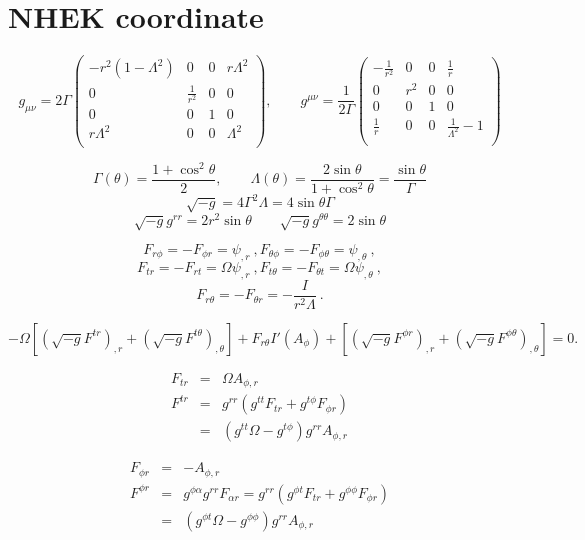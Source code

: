 \documentclass[aps,prd,preprint,groupedaddress]{revtex4-1}
\def\nn{\nonumber}
\def\beq{\begin{equation}}
\def\beqn{\begin{eqnarray}}
\def\eeq{\end{equation}}
\def\eeqn{\end{eqnarray}}
\def\st{\sin\theta}
\def\cct{\cos^2\theta}
\def\Ar{A_{\phi,r}}
\begin{document}
\newpage
\section{NHEK coordinate}

\[g_{\mu\nu}=2\Gamma\left(
  \begin{array}{cccc}
    -r^2(1-\Lambda^2) & 0 & 0 & r\Lambda^2 \\
    0& \frac{1}{r^2} & 0 & 0\\
    0 & 0 & 1 & 0 \\
   r\Lambda^2  & 0 & 0 & \Lambda^2 \\
  \end{array}\right), \qquad g^{\mu\nu}=\frac{1}{2\Gamma}\left(
  \begin{array}{cccc}
    -\frac{1}{r^2} & 0 & 0 & \frac{1}{r} \\
    0& r^2 & 0 & 0\\
    0 & 0 & 1 & 0 \\
   \frac{1}{r}  & 0 & 0 & \frac{1}{\Lambda^2}-1 \\
  \end{array}
\right)\]

\[\Gamma(\theta) = \frac{1+\cct}{2},\qquad \Lambda(\theta) = \frac{2\st}{1+\cct} = \frac{\st}{\Gamma} \]
\[\sqrt{-g} = 4\Gamma^2\Lambda = 4\st\Gamma \]
\[\sqrt{-g}g^{rr} = 2r^2\sin\theta\qquad \sqrt{-g}g^{\theta\theta} = 2\st \]

\beq
\label{poloidal}
F_{r\phi} = -F_{\phi r}=\psi_{,r} \ , F_{\theta\phi} = -
F_{\phi\theta} = \psi_{,\theta} \ ,
\eeq
\beq
\label{electricfield}
F_{tr} = -F_{rt} = \Omega \psi_{,r} \ , F_{t\theta}= - F_{\theta
t} = \Omega \psi_{,\theta} \ ,
\eeq
\beq
\label{toroidal}
F_{r\theta} = -F_{\theta r} = -\frac{I}{r^2\Lambda} \ .
\eeq

\beq
-\Omega\left[(\sqrt{-g}F^{tr})_{,r}+(\sqrt{-g}F^{t\theta})_{,\theta}\right]
+F_{r\theta}I'(A_\phi)
+\left[(\sqrt{-g}F^{\phi r})_{,r}+(\sqrt{-g}F^{\phi\theta})_{,\theta} \right]=0.
\eeq

\beqn
F_{tr}&=&\Omega \Ar\nn\\
F^{tr}&=&g^{rr}(g^{tt}F_{tr}+g^{t\phi}F_{\phi r}) \nn\\
&=&\left(g^{tt}\Omega - g^{t\phi} \right)g^{rr}\Ar
\eeqn

\beqn
F_{\phi r}
&=&- A_{\phi,r} \nn\\
F^{\phi r}
&=&g^{\phi\alpha}g^{rr}F_{\alpha r}
=g^{rr}(g^{\phi t} F_{tr} + g^{\phi\phi} F_{\phi r})\nn\\
&=& (g^{\phi t}\Omega-g^{\phi\phi})g^{rr}\Ar
\eeqn
\end{document}
